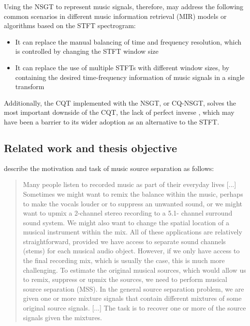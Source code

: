 \documentclass[letter,12pt,notitlepage]{article}
\begin{document}
Using the NSGT to represent music signals, therefore, may address the following common scenarios in different music information retrieval (MIR) models or algorithms based on the STFT spectrogram:

\begin{itemize}
	\item
		It can replace the manual balancing of time and frequency resolution, which is controlled by changing the STFT window size
	\item
		It can replace the use of multiple STFTs with different window sizes, by containing the desired time-frequency information of music signals in a single transform
\end{itemize}

Additionally, the CQT implemented with the NSGT, or CQ-NSGT, solves the most important downside of the CQT, the lack of perfect inverse \cite{jbrown, klapuricqt, fitzgeraldcqt}, which may have been a barrier to its wider adoption as an alternative to the STFT.

\subsection{Related work and thesis objective}

\citet{musicsepgood} describe the motivation and task of music source separation as follows:

\begin{quote}
	Many people listen to recorded music as part of their everyday lives [...] Sometimes we might want to remix the balance within the music, perhaps to make the vocals louder or to suppress an unwanted sound, or we might want to upmix a 2-channel stereo recording to a 5.1- channel surround sound system. We might also want to change the spatial location of a musical instrument within the mix. All of these applications are relatively straightforward, provided we have access to separate sound channels (stems) for each musical audio object. However, if we only have access to the final recording mix, which is usually the case, this is much more challenging. To estimate the original musical sources, which would allow us to remix, suppress or upmix the sources, we need to perform musical source separation (MSS). In the general source separation problem, we are given one or more mixture signals that contain different mixtures of some original source signals. [...] The task is to recover one or more of the source signals given the mixtures.
\end{quote}
\end{document}
